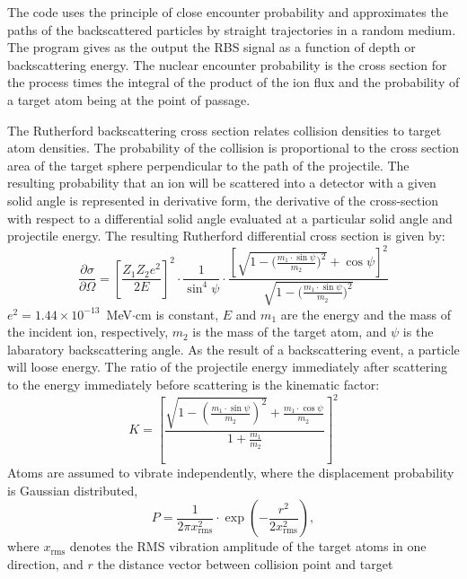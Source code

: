 The code uses the principle of close encounter probability \cite{I7102} and
approximates the paths of the backscattered particles by straight trajectories
in a random medium. The program gives as the output the RBS signal as a function
of depth or backscattering energy. The nuclear encounter probability is the
cross section for the process times the integral of the product of the ion flux
and the probability of a target atom being at the point of passage.

The Rutherford backscattering cross section relates collision densities to
target atom densities. The probability of the collision is proportional to the
cross section area of the target sphere perpendicular to the path of the
projectile. The resulting probability that an ion will be scattered into a
detector with a given solid angle is represented in derivative form, the
derivative of the cross-section with respect to a differential solid angle
evaluated at a particular solid angle and projectile energy. The resulting
Rutherford differential cross section is given by:
%
 \begin{equation}
   \frac{\partial \sigma}{\partial \Omega}= 
   \left[\frac{Z_1 Z_2 e^{2}}{2 E} \right]^{2} 
   \cdot \frac {1}{\sin^{4}\psi} \cdot
   \frac{\left[\sqrt{1-{(\frac{m_1\cdot \sin\psi}{m_2}})^{2}} + \cos\psi \right]^{2}}
   {\sqrt{1-{(\frac{m_1\cdot \sin\psi}{m_2}})^{2}}}
   \label{rbs:eq1}
 \end{equation}
%
$e^2=1.44 \times 10^{-13}$~MeV$\cdot$cm is constant, $E$ and $m_1$ are the
energy and the mass of the incident ion, respectively, $m_2$ is the mass of the
target atom, and $\psi$ is the labaratory backscattering angle.  As the result
of a backscattering event, a particle will loose energy. The ratio of the
projectile energy immediately after scattering to the energy immediately before
scattering is the kinematic factor:
%
\begin{equation}
  K = \left[\frac{\sqrt{1-(\frac{m_1\cdot \sin\psi}{m_2})^{2}} 
      + \frac{m_1 \cdot \cos\psi }{m_2}}
    {1 + \frac{m_1}{m_2}} \right]^{2}
  \label{rbs:eq2}
\end{equation}
%
Atoms are assumed to vibrate independently, where the displacement probability 
is Gaussian distributed,
%
\begin{equation}
  P = \frac{1}{2 \pi x_\mathrm{rms}^{2}} \cdot \exp(-\frac{r^{2}}{2
  x_\mathrm{rms}^{2}}),
  \label{rbs:eq3}
\end{equation}
%
where $x_\mathrm{rms}$ denotes the RMS vibration amplitude of the target atoms
in one direction, and $r$ the distance vector between collision point and target
